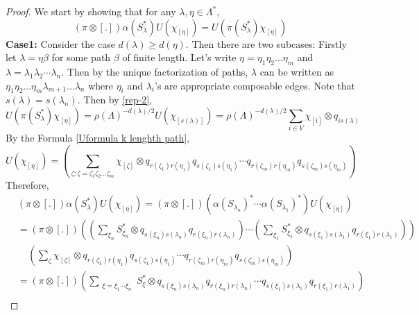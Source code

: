 \documentclass[10pt,a4paper]{amsart}
\begin{document}
\begin{proof}
We start by showing that for any $\lambda,\eta\in\Lambda^{\ast}$, 
\begin{equation}
\label{implementation_equation}
   (\pi\otimes [.]) \alpha(S_{\lambda}^{\ast})U(\chi_{[\eta]})=U(\pi(S_{\lambda}^{\ast})\chi_{[\eta]})
\end{equation}
 \textbf{Case1:} Consider the case $d(\lambda)\geq d(\eta)$. Then there are two subcases: Firstly let $\lambda=\eta\beta$ for some path $\beta$ of finite length. Let's write $\eta=\eta_{1}\eta_{2}\ldots\eta_{m}$ and $\lambda=\lambda_{1}\lambda_{2}\cdots\lambda_{n}$. Then by the unique factorization of paths, $\lambda$ can be written as $\eta_{1}\eta_{2}\ldots\eta_{m}\lambda_{m+1}\ldots\lambda_{n}$ where $\eta_{i}$ and $\lambda_{i}$'s are appropriate composable edges. Note that $s(\lambda)=s(\lambda_{n})$. Then by \ref{rep-2},  
\begin{displaymath}
U(\pi(S_{\lambda}^{\ast})\chi_{[\eta]})=\rho(\Lambda)^{-d(\lambda)/2}U(\chi_{[s(\lambda)]})=\rho(\Lambda)^{-d(\lambda)/2}\sum\limits_{i\in V}\chi_{[i]}\otimes q_{is(\lambda)}\end{displaymath}
 By the Formula \ref{Uformula k lenghth path},
\begin{displaymath}
U(\chi_{[\eta]})=\left(\sum\limits_{\zeta:\zeta=\zeta_{1}\zeta_{2}\ldots\zeta_{m}}\chi_{[\zeta]}\otimes q_{r(\zeta_{1})r(\eta_{1})}q_{s(\zeta_{1})s(\eta_{1})}\cdots q_{r(\zeta_{m})r(\eta_{m})}q_{s(\zeta_{m})s(\eta_{m})}\right)
\end{displaymath}
Therefore, 
\begin{equation*}
    \begin{aligned}
        &(\pi\otimes [.]) \alpha(S_{\lambda}^{\ast})U(\chi_{[\eta]})=  (\pi\otimes [.])(\alpha(S_{\lambda_{n}})^{\ast}\cdots \alpha(S_{\lambda_{1}})^{\ast}) U(\chi_{[\eta]})\\
&=(\pi\otimes [.])\left(\left(\sum\limits_{\xi_{n}}S_{\xi_{n}}^{*}\otimes q_{s(\xi_{n})s(\lambda_{n})}q_{r(\xi_{n})r(\lambda_{n})}\right)\cdots \left(\sum\limits_{\xi_{1}}S_{\xi_{1}}^{\ast}\otimes q_{s(\xi_{1})s(\lambda_{1})}q_{r(\xi_{1})r(\lambda_{1})}\right)\right)\\
&\;\;\;\;\left(\sum\limits_{\zeta}\chi_{[\zeta]}\otimes q_{r(\zeta_{1})r(\eta_{1})}q_{s(\zeta_{1})s(\eta_{1})}\cdots q_{r(\zeta_{m})r(\eta_{m})}q_{s(\zeta_{m})s(\eta_{m})}\right)\\
&=(\pi\otimes [.])\left(\sum\limits_{\substack{\xi=\xi_{1}\cdots\xi_{n}}}S_{\xi}^{*}\otimes q_{s(\xi_{n})s(\lambda_{n})}q_{r(\xi_{n})r(\lambda_{n})}\cdots  q_{s(\xi_{1})s(\lambda_{1})}q_{r(\xi_{1})r(\lambda_{1})} \right)\\

\end{aligned}
\end{equation*}
\end{proof}
\end{document}
